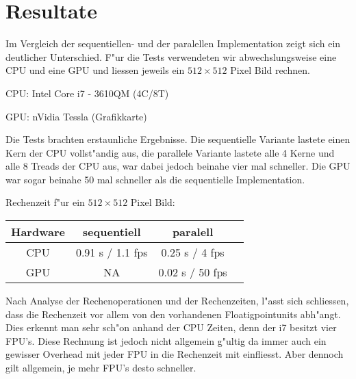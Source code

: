 \section{Resultate}

Im Vergleich der sequentiellen- und der paralellen Implementation
zeigt sich ein deutlicher Unterschied. F"ur die Tests verwendeten wir
abwechslungsweise eine CPU und eine GPU und liessen jeweils ein $512\times
512$ Pixel Bild rechnen. 

CPU: Intel Core i7 - 3610QM (4C/8T) 

GPU: nVidia Tessla (Grafikkarte) 

Die Tests brachten erstaunliche Ergebnisse. Die sequentielle Variante
lastete einen Kern der CPU vollst"andig aus, die parallele Variante
lastete alle 4 Kerne und alle 8 Treads der CPU aus, war dabei jedoch
beinahe vier mal schneller. Die GPU war sogar beinahe 50 mal schneller
als die sequentielle Implementation.

Rechenzeit f"ur ein $512\times 512$ Pixel Bild:
\begin{center}
\begin{tabular}[b]{|c|c|c|c|}
	\hline
	Hardware & sequentiell & paralell \\
	\hline \hline
	CPU & 0.91 s / 1.1 fps & 0.25 s / 4 fps \\
	\hline
	GPU & NA & 0.02 s / 50 fps \\
	\hline
\end{tabular}
\end{center}
	
Nach Analyse der Rechenoperationen und der Rechenzeiten, l"asst
sich schliessen, dass die Rechenzeit vor allem von den vorhandenen
Floatigpointunits abh"angt. Dies erkennt man sehr sch"on anhand der
CPU Zeiten, denn der i7 besitzt vier FPU's. Diese Rechnung ist jedoch
nicht allgemein g"ultig da immer auch ein gewisser Overhead mit jeder
FPU in die Rechenzeit mit einfliesst. Aber dennoch gilt allgemein,
je mehr FPU's desto schneller.



  
